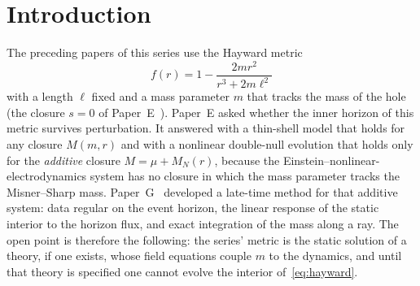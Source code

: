 \documentclass[11pt]{article}
\begin{document}
\section{Introduction}
\label{sec:intro}

The preceding papers of this series use the Hayward metric~\citep{Hayward2006}
\begin{equation}
f(r)=1-\frac{2mr^{2}}{r^{3}+2m\ell^{2}}
\label{eq:hayward}
\end{equation}
with a length $\ell$ fixed and a mass parameter $m$ that tracks the mass of the hole (the closure $s=0$ of Paper~E~\citep{PaperE}). Paper~E asked whether the inner horizon of this metric survives perturbation. It answered with a thin-shell model that holds for any closure $M(m,r)$ and with a nonlinear double-null evolution that holds only for the \emph{additive} closure $M=\mu+M_N(r)$, because the Einstein--nonlinear-electrodynamics system has no closure in which the mass parameter tracks the Misner--Sharp mass. Paper~G~\citep{PaperG} developed a late-time method for that additive system: data regular on the event horizon, the linear response of the static interior to the horizon flux, and exact integration of the mass along a ray. The open point is therefore the following: the series' metric is the static solution of a theory, if one exists, whose field equations couple $m$ to the dynamics, and until that theory is specified one cannot evolve the interior of~\eqref{eq:hayward}.
\end{document}
